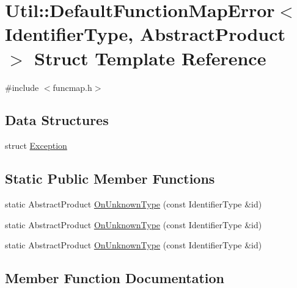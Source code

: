 \hypertarget{structUtil_1_1DefaultFunctionMapError}{}\section{Util\+:\+:Default\+Function\+Map\+Error$<$ Identifier\+Type, Abstract\+Product $>$ Struct Template Reference}
\label{structUtil_1_1DefaultFunctionMapError}


{\ttfamily \#include $<$funcmap.\+h$>$}

\subsection*{Data Structures}
\begin{DoxyCompactItemize}
\item 
struct \mbox{\hyperlink{structUtil_1_1DefaultFunctionMapError_1_1Exception}{Exception}}
\end{DoxyCompactItemize}
\subsection*{Static Public Member Functions}
\begin{DoxyCompactItemize}
\item 
static Abstract\+Product \mbox{\hyperlink{structUtil_1_1DefaultFunctionMapError_aebac7c15bf07b3c7b0c280eaea7b0eaa}{On\+Unknown\+Type}} (const Identifier\+Type \&id)
\item 
static Abstract\+Product \mbox{\hyperlink{structUtil_1_1DefaultFunctionMapError_aebac7c15bf07b3c7b0c280eaea7b0eaa}{On\+Unknown\+Type}} (const Identifier\+Type \&id)
\item 
static Abstract\+Product \mbox{\hyperlink{structUtil_1_1DefaultFunctionMapError_aebac7c15bf07b3c7b0c280eaea7b0eaa}{On\+Unknown\+Type}} (const Identifier\+Type \&id)
\end{DoxyCompactItemize}


\subsection{Member Function Documentation}
\mbox{\label{structUtil_1_1DefaultFunctionMapError_aebac7c15bf07b3c7b0c280eaea7b0eaa}} 
